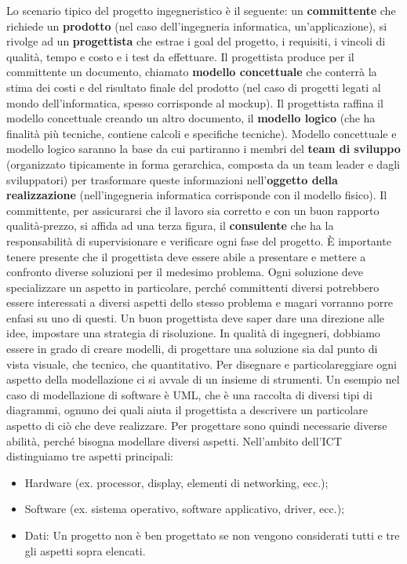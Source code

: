 Lo scenario tipico del progetto ingegneristico è il seguente: un \textbf{committente} che richiede un \textbf{prodotto} (nel caso dell’ingegneria informatica, un’applicazione), si rivolge ad un \textbf{progettista} che estrae i goal del progetto, i requisiti, i vincoli di qualità, tempo e costo e i test da effettuare. Il progettista produce per il committente un documento, chiamato \textbf{modello concettuale} che conterrà la stima dei costi e del risultato finale del prodotto (nel caso di progetti legati al mondo dell’informatica, spesso corrisponde al mockup). Il progettista raffina il modello concettuale creando un altro documento, il \textbf{modello logico} (che ha finalità più tecniche, contiene calcoli e specifiche tecniche). Modello concettuale e modello logico saranno la base da cui partiranno i membri del \textbf{team di sviluppo} (organizzato tipicamente in forma gerarchica, composta da un team leader e dagli sviluppatori) per trasformare queste informazioni nell’\textbf{oggetto della realizzazione} (nell’ingegneria informatica corrisponde con il modello fisico). Il committente, per assicurarsi che il lavoro sia corretto e con un buon rapporto qualità-prezzo, si affida ad una terza figura, il \textbf{consulente} che ha la responsabilità di supervisionare e verificare ogni fase del progetto.  È importante tenere presente che il progettista deve essere abile a presentare e mettere a confronto diverse soluzioni per il medesimo problema. Ogni soluzione deve specializzare un aspetto in particolare, perché committenti diversi potrebbero essere interessati a diversi aspetti dello stesso problema e magari vorranno porre enfasi su uno di questi. Un buon progettista deve saper dare una direzione alle idee, impostare una strategia di risoluzione. In qualità di ingegneri, dobbiamo essere in grado di creare modelli, di progettare una soluzione sia dal punto di vista visuale, che tecnico, che quantitativo. Per disegnare e particolareggiare ogni aspetto della modellazione ci si avvale di un insieme di strumenti. Un esempio nel caso di modellazione di software è UML, che è una raccolta di diversi tipi di diagrammi, ognuno dei quali aiuta il progettista a descrivere un particolare aspetto di ciò che deve realizzare. Per progettare sono quindi necessarie diverse abilità, perché bisogna modellare diversi aspetti. Nell’ambito dell’ICT distinguiamo tre aspetti principali:

\begin{itemize}

\item Hardware (ex. processor, display, elementi di networking, ecc.);
\item Software (ex. sistema operativo, software applicativo, driver, ecc.);
\item Dati: Un progetto non è ben progettato se non vengono considerati tutti e tre gli aspetti sopra elencati.

\end{itemize}

